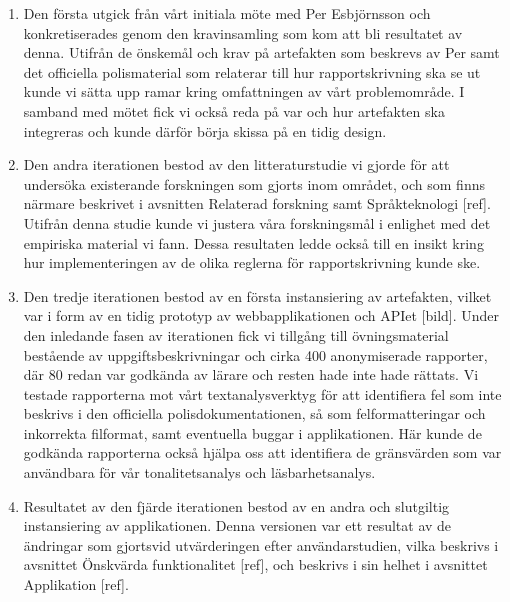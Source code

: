 \documentclass[swedish]{maucsthesis}
\begin{document}
\begin{enumerate}
\item Den första utgick från vårt initiala möte med Per Esbjörnsson och
  konkretiserades genom den kravinsamling som kom att bli resultatet av denna.
  Utifrån de önskemål och krav på artefakten som beskrevs av Per samt det
  officiella polismaterial som relaterar till hur rapportskrivning ska se ut
  kunde vi sätta upp ramar kring omfattningen av vårt problemområde. I samband
  med mötet fick vi också reda på var och hur artefakten ska integreras och
  kunde därför börja skissa på en tidig design.
\item Den andra iterationen bestod av den litteraturstudie vi gjorde för att
  undersöka existerande forskningen som gjorts inom området, och som finns
  närmare beskrivet i avsnitten Relaterad forskning samt Språkteknologi [ref].
  Utifrån denna studie kunde vi justera våra forskningsmål i enlighet med det
  empiriska material vi fann. Dessa resultaten ledde också till en insikt kring
  hur implementeringen av de olika reglerna för rapportskrivning kunde ske.
\item Den tredje iterationen bestod av en första instansiering av artefakten,
  vilket var i form av en tidig prototyp av webbapplikationen och APIet [bild].
  Under den inledande fasen av iterationen fick vi tillgång till övningsmaterial
  bestående av uppgiftsbeskrivningar och cirka 400 anonymiserade rapporter, där
  80 redan var godkända av lärare och resten hade inte hade rättats. Vi testade
  rapporterna mot vårt textanalysverktyg för att identifiera fel som inte
  beskrivs i den officiella polisdokumentationen, så som felformatteringar och
  inkorrekta filformat, samt eventuella buggar i applikationen. Här kunde de
  godkända rapporterna också hjälpa oss att identifiera de gränsvärden som var
  användbara för vår tonalitetsanalys och läsbarhetsanalys.
\item Resultatet av den fjärde iterationen bestod av en andra och slutgiltig
  instansiering av applikationen. Denna versionen var ett resultat av de
  ändringar som gjortsvid utvärderingen efter användarstudien, vilka beskrivs i
  avsnittet Önskvärda funktionalitet [ref], och beskrivs i sin helhet i
  avsnittet Applikation [ref].
\end{enumerate}
\end{document}
